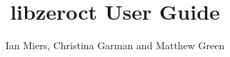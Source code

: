 \documentclass[12pt]{article}
\begin{document}
\newcommand{\libzeroct}{\textsf{libzeroct}}

\title{libzeroct User Guide}
\author{Ian Miers, Christina Garman and Matthew Green}
\date{}
\maketitle



\end{document}
